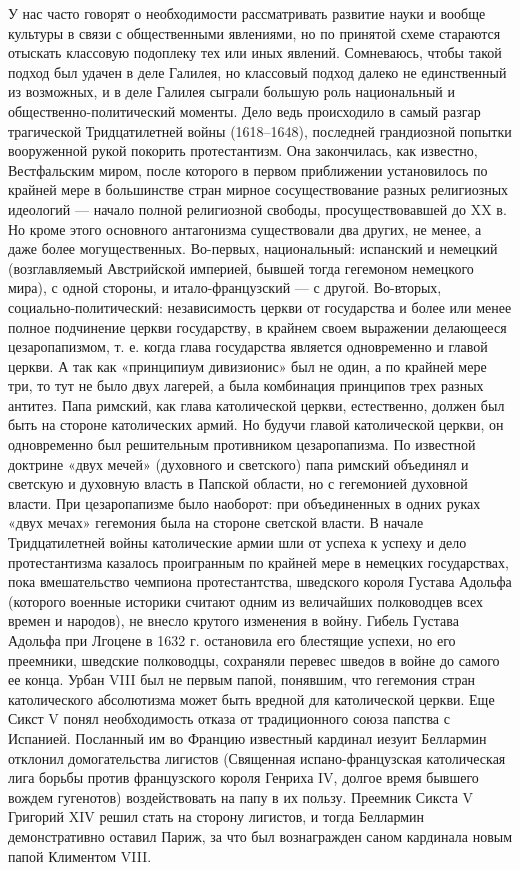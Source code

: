 У нас часто говорят о необходимости рассматривать развитие науки и вообще
культуры в связи с общественными явлениями, но по принятой схеме стараются
отыскать классовую подоплеку тех или иных явлений. Сомневаюсь, чтобы такой
подход был удачен в деле Галилея, но классовый подход далеко не единственный из
возможных, и в деле Галилея сыграли большую роль национальный и
общественно-политический моменты. Дело ведь происходило в самый разгар
трагической Тридцатилетней войны (1618--1648), последней грандиозной попытки
вооруженной рукой покорить протестантизм. Она закончилась, как известно,
Вестфальским миром, после которого в первом приближении установилось по крайней
мере в большинстве стран мирное сосуществование разных религиозных идеологий ---
начало полной религиозной свободы, просуществовавшей до XX в. Но кроме этого
основного антагонизма существовали два других, не менее, а даже более
могущественных. Во-первых, национальный: испанский и немецкий (возглавляемый
Австрийской империей, бывшей тогда гегемоном немецкого мира), с одной стороны,
и итало-французский --- с другой. Во-вторых, социально-политический:
независимость церкви от государства и более или менее полное подчинение церкви
государству, в крайнем своем выражении делающееся цезаропапизмом, т. е. когда
глава государства является одновременно и главой церкви. А так как «принципиум
дивизионис» был не один, а по крайней мере три, то тут не было двух лагерей, а
была комбинация принципов трех разных антитез. Папа римский, как глава
католической церкви, естественно, должен был быть на стороне католических
армий. Но будучи главой католической церкви, он одновременно был решительным
противником цезаропапизма. По известной доктрине «двух мечей» (духовного и
светского) папа римский объединял и светскую и духовную власть в
Папской области, но с гегемонией духовной власти. При цезаропапизме было
наоборот: при объединенных в одних руках «двух мечах» гегемония была на стороне
светской власти. В начале Тридцатилетней войны католические армии шли от успеха
к успеху и дело протестантизма казалось проигранным по крайней мере в немецких
государствах, пока вмешательство чемпиона протестантства, шведского короля
Густава Адольфа (которого военные историки считают одним из величайших
полководцев всех времен и народов), не внесло крутого изменения в войну. Гибель
Густава Адольфа при Лгоцене в 1632 г. остановила его блестящие успехи, но его
преемники, шведские полководцы, сохраняли перевес шведов в войне до самого ее
конца. Урбан VIII был не первым папой, понявшим, что гегемония стран
католического абсолютизма может быть вредной для католической церкви. Еще Сикст
V понял необходимость отказа от традиционного союза папства с Испанией.
Посланный им во Францию известный кардинал иезуит Беллармин отклонил
домогательства лигистов (Священная испано-французская католическая лига борьбы
против французского короля Генриха IV, долгое время бывшего вождем гугенотов)
воздействовать на папу в их пользу. Преемник Сикста V Григорий XIV решил стать
на сторону лигистов, и тогда Беллармин демонстративно оставил Париж, за что был
вознагражден саном кардинала новым папой Климентом VIII.

